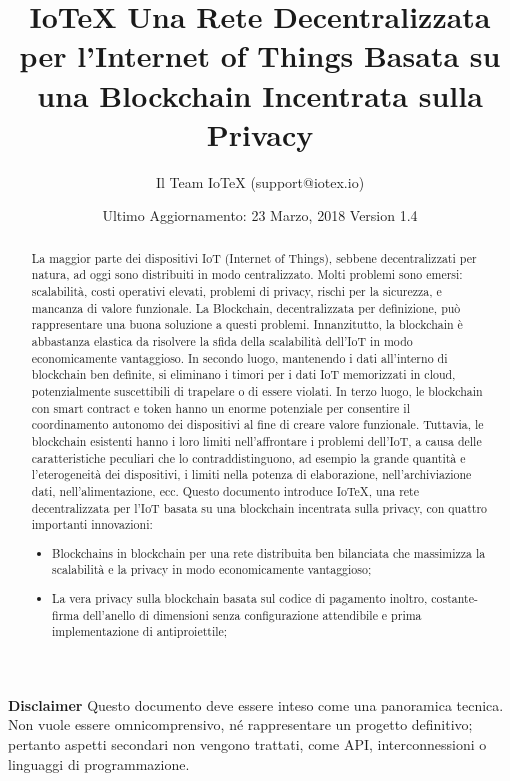 \documentclass[a4paper,12pt,draft]{article}
\title{IoTeX
\linebreak
\Large Una Rete Decentralizzata per l'Internet of Things
\linebreak
\Large Basata su una Blockchain Incentrata sulla Privacy}
\author{Il Team IoTeX (support@iotex.io)}
\date{Ultimo Aggiornamento: 23 Marzo, 2018
\linebreak Version 1.4}
\begin{document}
\maketitle

\vspace{120pt}


\textbf{Disclaimer} Questo documento deve essere inteso come una panoramica tecnica. Non vuole essere omnicomprensivo, né rappresentare un progetto definitivo; pertanto aspetti secondari non vengono trattati, come API, interconnessioni o linguaggi di programmazione.

\pagebreak

\begin{abstract}
	La maggior parte dei dispositivi IoT (Internet of Things), sebbene decentralizzati per natura, ad oggi sono distribuiti in modo centralizzato. Molti problemi sono emersi: scalabilità, costi operativi elevati, problemi di privacy, rischi per la sicurezza, e mancanza di valore funzionale. La Blockchain, decentralizzata per definizione, può rappresentare una buona soluzione a questi problemi. Innanzitutto, la blockchain è abbastanza elastica da risolvere la sfida della scalabilità dell'IoT in modo economicamente vantaggioso. In secondo luogo, mantenendo i dati all'interno di blockchain ben definite, si eliminano i timori per i dati IoT memorizzati in cloud, potenzialmente suscettibili di trapelare o di essere violati. In terzo luogo, le blockchain con smart contract e token hanno un enorme potenziale per consentire il coordinamento autonomo dei dispositivi al fine di creare valore funzionale. Tuttavia, le blockchain esistenti hanno i loro limiti nell'affrontare i problemi dell'IoT, a causa delle caratteristiche peculiari che lo contraddistinguono, ad esempio la grande quantità e l'eterogeneità dei dispositivi, i limiti nella potenza di elaborazione, nell'archiviazione dati, nell'alimentazione, ecc.
	Questo documento introduce IoTeX, una rete decentralizzata per l'IoT basata su una blockchain incentrata sulla privacy, con quattro importanti innovazioni:

	\begin{itemize}

		\item
		      Blockchains in blockchain per una rete distribuita ben bilanciata che massimizza la scalabilità e la privacy in modo economicamente vantaggioso;

		\item
		      La vera privacy sulla blockchain basata sul codice di pagamento inoltro, costante- firma dell'anello di dimensioni senza configurazione attendibile e prima implementazione di antiproiettile;


\end{itemize}
\end{abstract}
\end{document}
